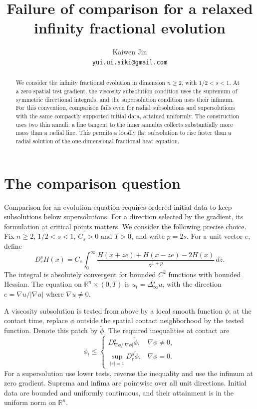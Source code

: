 \documentclass[11pt]{article}
\title{Failure of comparison for a relaxed infinity fractional evolution}
\author{Kaiwen Jin\\\small\texttt{yui.ui.siki@gmail.com}}
\date{}
\newcommand{\R}{\mathbb R}
\begin{document}
\maketitle
\begin{abstract}
We consider the infinity fractional evolution in dimension $n\ge2$, with
$1/2<s<1$. At a zero spatial test gradient, the viscosity subsolution condition
uses the supremum of symmetric directional integrals, and the supersolution
condition uses their infimum. For this convention, comparison fails even for
radial subsolutions and supersolutions with the same compactly
supported initial data, attained uniformly. The construction uses two thin
annuli: a line tangent to the inner annulus collects substantially more mass
than a radial line. This permits a locally flat subsolution to rise faster
than a radial solution of the one-dimensional fractional heat equation.
\end{abstract}

\section{The comparison question}

Comparison for an evolution equation requires ordered initial data to keep
subsolutions below supersolutions. For a direction selected by the gradient,
its formulation at critical points matters. We consider the following precise
choice. Fix $n\ge2$, $1/2<s<1$, $C_s>0$ and $T>0$, and write $p=2s$.
For a unit vector $e$, define
\begin{equation}\label{eq:direction}
 D_e^s H(x)=C_s\int_0^\infty
 \frac{H(x+ze)+H(x-ze)-2H(x)}{z^{1+p}}\,dz.
\end{equation}
The integral is absolutely convergent for bounded $C^2$ functions with bounded
Hessian. The equation on $\R^n\times(0,T)$ is
$u_t=\Delta_\infty^s u$, with the direction $e=\nabla u/|\nabla u|$ where
$\nabla u\ne0$.

A viscosity subsolution is tested from above by a local smooth function
$\phi$; at the contact time, replace $\phi$ outside the spatial contact
neighborhood by the tested function. Denote this patch by $\widetilde\phi$.
The required inequalities at contact are
\begin{equation}\label{eq:weak}
 \phi_t\le
 \begin{cases}
 D_{\nabla\phi/|\nabla\phi|}^s\widetilde\phi,&\nabla\phi\ne0,\\
 \displaystyle\sup_{|e|=1}D_e^s\widetilde\phi,&\nabla\phi=0.
 \end{cases}
\end{equation}
For a supersolution use lower tests, reverse the inequality and use the
infimum at zero gradient. Suprema and infima are pointwise over all unit
directions. Initial data are bounded and uniformly continuous, and their
attainment is in the uniform norm on $\R^n$.
\end{document}
